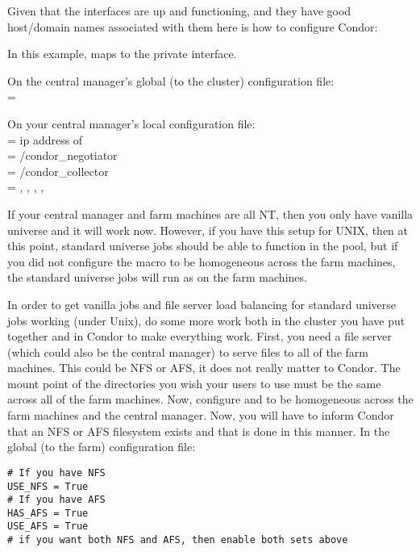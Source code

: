 Given that the interfaces are up and functioning, and they have good
host/domain names associated with them here is how to configure Condor:

In this example,  maps to the private interface.

On the central manager's global (to the cluster) configuration file: \\
 = 

On your central manager's local configuration file: \\
 = ip address of  \\
 = /condor\_negotiator \\
 = /condor\_collector \\
 = , , , , 

If your central manager and farm machines are all NT, then you only have
vanilla universe and it will work now.  However, if you have this setup
for UNIX, then at this point, standard universe jobs should be able to
function in the pool, but if you did not configure the 
macro to be homogeneous across the farm machines, the standard universe
jobs will run as  on the farm machines.

In order to get vanilla jobs and file server load balancing for standard
universe jobs working (under Unix), do some more work both in
the cluster you have put together and in Condor to make everything work.
First, you need a file server (which could also be the central manager) to
serve files to all of the farm machines. This could be NFS or AFS, it does
not really matter to Condor. The mount point of the directories you wish
your users to use must be the same across all of the farm machines. Now,
configure  and  to be
homogeneous across the farm machines and the central manager. Now, you
will have to inform Condor that an NFS or AFS filesystem exists and that
is done in this manner. In the global (to the farm) configuration file:

\begin{verbatim}
# If you have NFS
USE_NFS = True
# If you have AFS
HAS_AFS = True
USE_AFS = True
# if you want both NFS and AFS, then enable both sets above
\end{verbatim}

